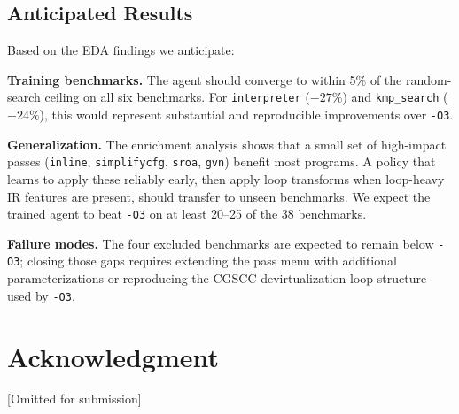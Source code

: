 \documentclass[conference]{IEEEtran}
\begin{document}
\subsection{Anticipated Results}

Based on the EDA findings we anticipate:

\textbf{Training benchmarks.}  The agent should converge to within 5\% of the
random-search ceiling on all six benchmarks.  For \texttt{interpreter}
($-27\%$) and \texttt{kmp\_search} ($-24\%$), this would represent substantial
and reproducible improvements over \texttt{-O3}.

\textbf{Generalization.}  The enrichment analysis shows that a small set of
high-impact passes (\texttt{inline}, \texttt{simplifycfg}, \texttt{sroa},
\texttt{gvn}) benefit most programs.  A policy that learns to apply these
reliably early, then apply loop transforms when loop-heavy IR features are
present, should transfer to unseen benchmarks.  We expect the trained agent to
beat \texttt{-O3} on at least 20--25 of the 38 benchmarks.

\textbf{Failure modes.}  The four excluded benchmarks are expected to remain
below \texttt{-O3}; closing those gaps requires extending the pass menu with
additional parameterizations or reproducing the CGSCC devirtualization loop
structure used by \texttt{-O3}.

\section*{Acknowledgment}
[Omitted for submission]



\end{document}
